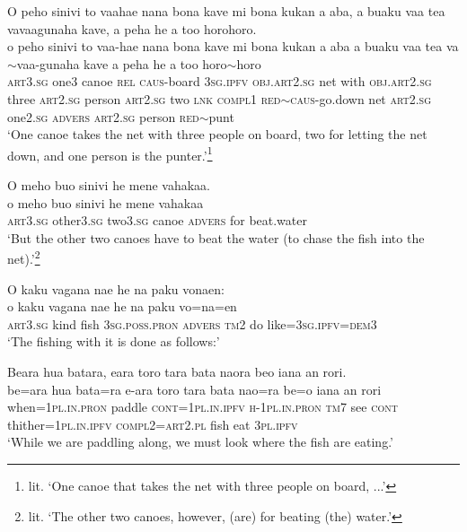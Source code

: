 \ea\label{ex:text23-5}
O peho sinivi to vaahae nana bona kave mi bona kukan a aba, a buaku vaa tea vavaagunaha kave, a peha he a too horohoro.\\
\gll o	peho	sinivi	to	vaa-hae	nana	bona	kave	mi	bona	kukan	a	aba	a	buaku	vaa	tea	va{$\sim$}vaa-gunaha	kave	a	peha	he	a	too	horo{$\sim$}horo\\
     \textsc{art}3.\textsc{sg}	one3	canoe	\textsc{rel}	\textsc{caus}-board	3\textsc{sg}.\textsc{ipfv}	\textsc{obj}.\textsc{art}2.\textsc{sg}	net	with	\textsc{obj}.\textsc{art}2.\textsc{sg}	three	\textsc{art}2.\textsc{sg}	person	\textsc{art}2.\textsc{sg}	two	\textsc{lnk}	\textsc{compl}1	\textsc{red}{$\sim$}\textsc{caus}-go.down	net	\textsc{art}2.\textsc{sg}	one2.\textsc{sg}	\textsc{advers}	\textsc{art}2.\textsc{sg}	person	\textsc{red}{$\sim$}punt\\
\glt `One canoe takes the net with three people on board, two for letting the net down, and one person is the punter.'\footnote{lit. `One canoe that takes the net with three people on board, ...'}
\z

\ea\label{ex:text23-6}
O meho buo sinivi he mene vahakaa.\\
\gll o	meho	buo	sinivi	he	mene	vahakaa\\
     \textsc{art}3.\textsc{sg}	other3.\textsc{sg}	two3.\textsc{sg}	canoe	\textsc{advers}	for	beat.water\\
\glt `But the other two canoes have to beat the water (to chase the fish into the net).'\footnote{lit. `The other two canoes, however, (are) for beating (the) water.'}
\z

\ea\label{ex:text23-7}
O kaku vagana nae he na paku vonaen:\\
\gll o	kaku	vagana	nae	he	na	paku	vo=na=en\\
     \textsc{art}3.\textsc{sg}	kind	fish	3\textsc{sg}.\textsc{poss}.\textsc{pron}	\textsc{advers}	\textsc{tm}2	do	like=3\textsc{sg}.\textsc{ipfv}=\textsc{dem}3\\
\glt `The fishing with it is done as follows:'
\z

\ea\label{ex:text23-8}
Beara hua batara, eara toro tara bata naora beo iana an rori.\\
\gll be=ara	hua	bata=ra	e-ara	toro	tara	bata	nao=ra	be=o	iana	an	rori\\
     when=1\textsc{pl}.\textsc{in}.\textsc{pron}	paddle	\textsc{cont}=1\textsc{pl}.\textsc{in}.\textsc{ipfv}	\textsc{h}-1\textsc{pl}.\textsc{in}.\textsc{pron}	\textsc{tm}7	see	\textsc{cont}	thither=1\textsc{pl}.\textsc{in}.\textsc{ipfv}	\textsc{compl}2=\textsc{art}2.\textsc{pl}	fish	eat	3\textsc{pl}.\textsc{ipfv}\\
\glt `While we are paddling along, we must look where the fish are eating.'
\z

